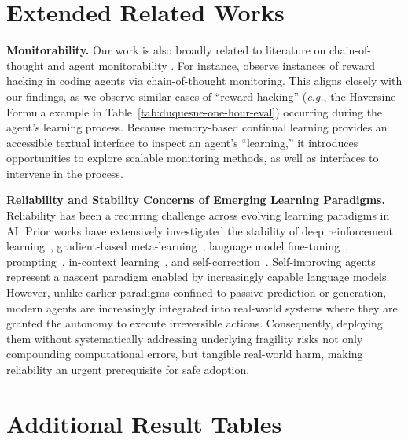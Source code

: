 \documentclass{article}
\begin{document}
\section{Extended Related Works}

\textbf{Monitorability.} Our work is also broadly related to literature on chain-of-thought and agent monitorability \cite{baker2025monitoringreasoningmodelsmisbehavior,guan2025monitoringmonitorability,meng2025docent}. For instance, \citet{baker2025monitoringreasoningmodelsmisbehavior} observe instances of reward hacking in coding agents via chain-of-thought monitoring. This aligns closely with our findings, as we observe similar cases of ``reward hacking'' (\textit{e.g.}, the Haversine Formula example in Table~\ref{tab:duquesne-one-hour-eval}) occurring during the agent's learning process. 
Because memory-based continual learning provides an accessible textual interface to inspect an agent's ``learning,'' it introduces opportunities to explore scalable monitoring methods, as well as interfaces to intervene in the process.

\textbf{Reliability and Stability Concerns of Emerging Learning Paradigms.}
Reliability has been a recurring challenge across evolving learning paradigms in AI. Prior works have extensively investigated the stability of deep reinforcement learning~\citep{henderson2019deepreinforcementlearningmatters}, gradient-based meta-learning~\citep{finn2017modelagnosticmetalearningfastadaptation,antoniou2018how}, language model fine-tuning~\citep{zhang2021revisiting,dodge2020finetuningpretrainedlanguagemodels}, prompting~\citep{sclar2024quantifying,multi-prompt-eval}, in-context learning~\citep{zhao2021calibrateuseimprovingfewshot,lu-etal-2022-fantastically,voronov-etal-2024-mind}, and self-correction~\citep{huang2024large}.
Self-improving agents represent a nascent paradigm enabled by increasingly capable language models. However, unlike earlier paradigms confined to passive prediction or generation, modern agents are increasingly integrated into real-world systems where they are granted the autonomy to execute irreversible actions. Consequently, deploying them without systematically addressing underlying fragility risks not only compounding computational errors, but tangible real-world harm, making reliability an urgent prerequisite for safe adoption.

\section{Additional Result Tables}
\label{app:additional-tables}
\end{document}
